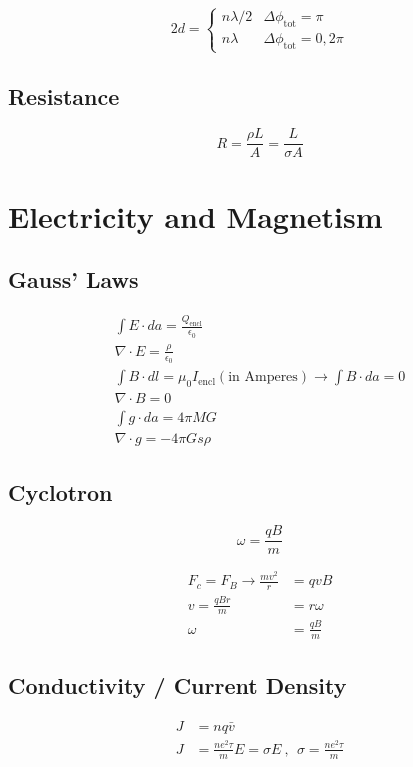 \documentclass[10pt,a4paper]{article}
\begin{document}
\[
2d = 
  \begin{cases}
   n\lambda/2 & \Delta \phi_\textrm{tot} = \pi\\
   n\lambda & \Delta \phi_\textrm{tot} = 0, 2\pi
  \end{cases}
\]

\subsection{Resistance}
\begin{equation}
 R = \frac{\rho L }{A} = \frac{L}{\sigma A} 
\end{equation}


\section{Electricity and Magnetism}
\subsection{Gauss' Laws}
\begin{align}
 \int E\cdot da = \frac{Q_{\textrm{encl}}}{\epsilon_0}\\
 \nabla \cdot E = \frac{\rho}{\epsilon_0}\\
 \int B\cdot dl = \mu_0 I_{\textrm{encl}}(\textrm{in Amperes}) \rightarrow \int B \cdot da = 0\\
 \nabla \cdot B = 0 \\
 \int g\cdot da = 4 \pi M G\\
 \nabla \cdot g = -4\pi Gs\rho
\end{align}

\subsection{Cyclotron}
\begin{equation}
 \omega = \frac{qB}{m}
\end{equation}

\begin{align}
 F_c = F_B \rightarrow \frac{mv^2}{r} &= qvB\\
 v= \frac{qBr}{m} &= r\omega\\
 \omega &= \frac{qB}{m}
\end{align}

\subsection{Conductivity / Current Density}
\begin{align}
 J &= nq\bar{v}\\
 J &= \frac{ne^2\tau}{m}E = \sigma E~,~~\sigma = \frac{ne^2\tau}{m}
\end{align}
\end{document}
